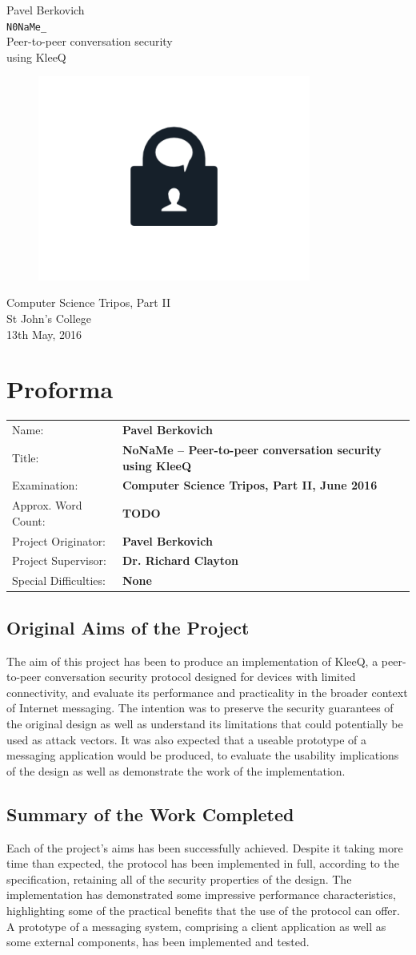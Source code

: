 \documentclass[a4paper, 12pt]{report}
\newcommand*{\titleTH}{ %
\begingroup
\raggedleft
\thispagestyle{empty}
{\Large Pavel Berkovich}\\[0.167\textheight] \centering
{\huge \texttt{N0NaMe\_}}\\[\baselineskip]
{\Large Peer-to-peer conversation security \\ using KleeQ} \\
\begin{figure}[h]
    \centering
    \includegraphics[width = 0.8\textwidth]{lock_chat.png} 
\end{figure}
{\large Computer Science Tripos, Part II}\\ \vspace{3mm}
{\large St John's College} \\ \vspace{3mm}
{\large 13th May, 2016}
\vfill
\clearpage
\endgroup}
\begin{document}
\titleTH


\chapter*{Proforma}
\begin{tabular}{l >{\bfseries}l}
    Name: & Pavel Berkovich \\
    Title: & NoNaMe -- Peer-to-peer conversation security using KleeQ \\
    Examination: & Computer Science Tripos, Part II, June 2016 \\
    Approx. Word Count: & {\color{red} TODO} \\
    Project Originator: & Pavel Berkovich \\
    Project Supervisor: & Dr. Richard Clayton \\
    Special Difficulties: & None
\end{tabular}

\section*{Original Aims of the Project}
The aim of this project has been to produce an implementation of KleeQ, a peer-to-peer conversation security protocol designed for devices with limited connectivity, and evaluate its performance and practicality in the broader context of Internet messaging. The intention was to preserve the security guarantees of the original design as well as understand its limitations that could potentially be used as attack vectors. It was also expected that a useable prototype of a messaging application would be produced, to evaluate the usability implications of the design as well as demonstrate the work of the implementation.

\section*{Summary of the Work Completed}

Each of the project's aims has been successfully achieved. Despite it taking more time than expected, the protocol has been implemented in full, according to the specification, retaining all of the security properties of the design. The implementation has demonstrated some impressive performance characteristics, highlighting some of the practical benefits that the use of the protocol can offer. A prototype of a messaging system, comprising a client application as well as some external components, has been implemented and tested. \\
\end{document}

